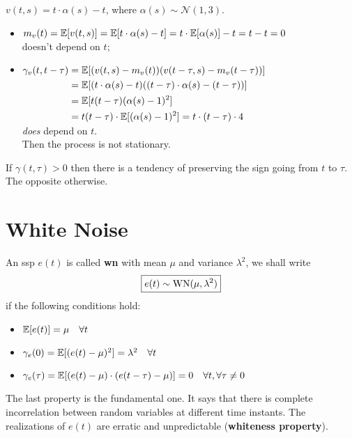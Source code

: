 \begin{example}
$\boxed{v(t, s)=t \cdot \alpha(s)-t}$, where $\alpha(s) \sim \mathcal{N}(1,3)$.
\begin{itemize}
	\item $m_{v}(t)=\mathbb{E}[v(t, s)]=\mathbb{E}[t \cdot \alpha(s)-t]=t \cdot \mathbb{E}[\alpha(s)]-t=t-t=0$\\
	doesn't depend on $t$;
	\item $\begin{aligned}[t]
		\gamma_{v}(t, t-\tau)&=\mathbb{E}[(v(t, s)-m_{v}(t))(v(t-\tau, s)-m_{v}(t-\tau))]\\
	&=\mathbb{E}[(t \cdot \alpha(s)-t)((t-\tau) \cdot \alpha(s)-(t-\tau))]\\
	&=\mathbb{E}[t(t-\tau)(\alpha(s)-1)^{2}]\\
	&=t(t-\tau) \cdot \mathbb{E}[(\alpha(s)-1)^{2}]=t \cdot(t-\tau) \cdot 4
	\end{aligned}$\\
	\emph{does} depend on $t$.\\
	Then the process is not stationary.
\end{itemize}
\end{example}

\begin{obs}
If $\gamma(t, \tau)>0$ then there is a tendency of preserving the sign going from $t$ to $\tau $. The opposite otherwise.
\end{obs}
\section{White Noise}

\begin{definition}
	An \gls{ssp} $e(t)$ is called \textbf{\gls{wn}} with mean $\mu$ and variance $\lambda^{2}$, we shall write
	\[
		\boxed{e(t) \sim \operatorname{WN}(\mu, \lambda^{2})}
	\]
	if the following conditions hold:
	\begin{itemize}
		\item $\mathbb{E}[e(t)]=\mu \quad \forall t$
		\item $\gamma_{e}(0)=\mathbb{E}[(e(t)-\mu)^{2}]=\lambda^{2} \quad \forall t$
		\item $\gamma_{e}(\tau)=\mathbb{E}[(e(t)-\mu) \cdot(e(t-\tau)-\mu)]=0 \quad \forall t, \forall \tau \neq 0$
	\end{itemize}	
\end{definition}
The last property is the fundamental one. It says that there is complete incorrelation between random variables at different time instants. The realizations of $e(t)$ are erratic and unpredictable (\textbf{whiteness property}).

